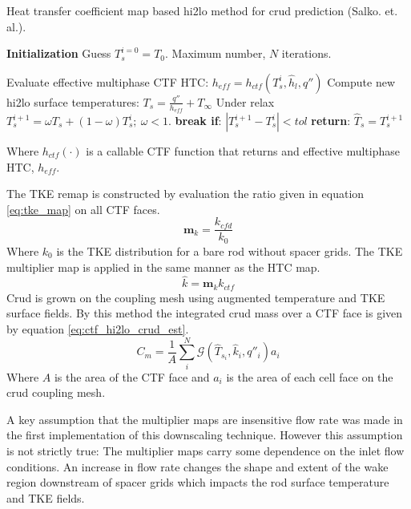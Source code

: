     \begin{algorithm}[H]
        \caption{Heat transfer coefficient map based hi2lo method for crud prediction (Salko. et. al.).}
    \begin{algorithmic}[1]
    \STATE \textbf{Initialization} 
    \STATE Guess $T^{i=0}_s=T_0$.  Maximum number, $N$ iterations.

           \STATE Evaluate effective multiphase CTF HTC: $h_{eff} = h_{{ctf}}(T^i_{s}, \hat h_l, q'')$ \;
           \STATE Compute new hi2lo surface temperatures: $T_{s} = \frac{q''}{h_{eff}} + T_\infty$ \;
           \STATE  Under relax  $T^{i+1}_{s} = \omega T_{s} + (1 - \omega) T^{i}_{s} ;\ \omega < 1.$ \;
           \STATE  \textbf{break if}:  $|T^{i+1}_s - T^i_s| < tol$ \;
        \ENDFOR 
    \STATE \textbf{return}: $\hat T_s = T^{i+1}_s$
    \end{algorithmic}
    \end{algorithm}
    Where $h_{ctf}(\cdot)$ is a callable CTF function that returns and effective multiphase HTC, $h_{eff}$.

    The TKE remap is constructed by evaluation the ratio given in equation \ref{eq:tke_map} on all CTF faces.
    \begin{equation}
       \mathbf m_{k} = \frac{k_{cfd}}{k_{0}}
       \label{eq:tke_map}
    \end{equation}
    Where $k_0$ is the TKE distribution for a bare rod without spacer grids.
    The TKE multiplier map is applied in the same manner as the HTC map.
       \begin{equation}
       \hat k = \mathbf m_k k_{ctf}
       \end{equation}
    Crud is grown on the coupling mesh using augmented temperature and TKE surface fields. By this method the integrated crud mass over a CTF face is given by equation \ref{eq:ctf_hi2lo_crud_est}.
     \begin{equation}
     C_m = \frac{1}{A} \sum_i^N \mathcal G(\hat T_{s_i}, \hat k_i, q''_i) a_i
     \label{eq:ctf_hi2lo_crud_est}
     \end{equation}
    Where $A$ is the area of the CTF face and $a_i$ is the area of each cell face on the crud coupling mesh.

    
    A key assumption that the multiplier maps are insensitive flow rate was made in the first implementation of this downscaling technique.  However this assumption is not strictly true: The multiplier maps carry some dependence on the inlet flow conditions.  An increase in flow rate changes the shape and extent of the wake region downstream of spacer grids which impacts the rod surface temperature and TKE fields.

